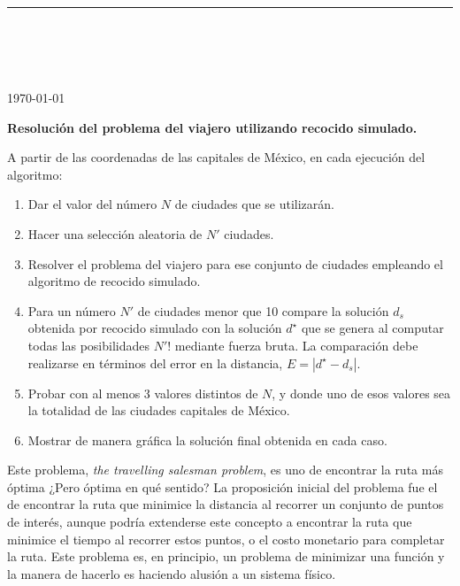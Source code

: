 



\thispagestyle{empty}

\begin{center}
\textsc{\theinstitution}\\[2mm]

\thedepartment

\rule{0.6\textwidth}{0.5pt}\\[2mm]

\thecourse \\[4mm]

{\Large \textbf{\thetitle}}\\[2mm]

\theauthor \\[2mm]

{\small \today}
\end{center}
\medskip

\vspace{1cm}

\textbf{Resolución del problema del viajero utilizando recocido simulado.}

A partir de las coordenadas de las capitales de México, en cada ejecución del algoritmo:
\begin{enumerate}
    \item Dar el valor del número $N$ de ciudades que se utilizarán.
    \item Hacer una selección aleatoria de $N'$ ciudades.
    \item Resolver el problema del viajero para ese conjunto de ciudades empleando el algoritmo de recocido simulado.
    \item Para un número $N'$ de ciudades menor que 10 compare la solución $d_s$ obtenida por recocido simulado con la solución $d^{\star}$ que se genera al computar todas las posibilidades $N'!$ mediante fuerza bruta. La comparación debe realizarse en términos del error en la distancia, $E = |d^{\star} - d_s|$.
    \item Probar con al menos 3 valores distintos de $N$, y donde uno de esos valores sea la totalidad de las ciudades capitales de México.
    \item Mostrar de manera gráfica la solución final obtenida en cada caso.
\end{enumerate}

Este problema, \textit{the travelling salesman problem}, es uno de encontrar la ruta más óptima ¿Pero óptima en qué sentido? La proposición inicial del problema fue el de encontrar la ruta que minimice la distancia al recorrer un conjunto de puntos de interés, aunque podría extenderse este concepto a encontrar la ruta que minimice el tiempo al recorrer estos puntos, o el costo monetario para completar la ruta. Este problema es, en principio, un problema de minimizar una función y la manera de hacerlo es haciendo alusión a un sistema físico.

